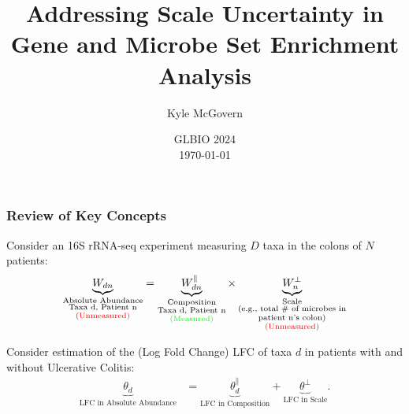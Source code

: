 \documentclass[11pt]{beamer}
\title[DSA Scale Uncertainty]{Addressing Scale Uncertainty in Gene and Microbe Set Enrichment Analysis}
\author[Kyle McGovern]{Kyle McGovern}
\institute[Penn State]{The Pennsylvania State University \\ \smallskip \textit{kvm6065@psu.edu}}
\date[\today]{GLBIO 2024 \\ \today}
\begin{document}

\begin{frame}
	\titlepage %
\end{frame}

\begin{frame}
    \frametitle{Review of Key Concepts}

    Consider an 16S rRNA-seq experiment measuring \(D\) taxa in the colons of \(N\) patients:
    \begin{align*}
      \underbrace{W_{dn}}_{\substack{\text{Absolute Abundance} \\ \text{Taxa d, Patient n} \\ \text{\textcolor{red}{(Unmeasured)}}}} = \underbrace{W^\parallel_{dn}}_{\substack{\text{Composition} \\ \text{Taxa d, Patient n} \\ \text{\textcolor{green}{(Measured)}}}} \times \underbrace{W^\perp_n}_{\substack{\text{Scale} \\ \text{(e.g., total \# of microbes in} \\ \text{patient n's colon)} \\ \text{\textcolor{red}{(Unmeasured)}}}}
    \end{align*}

    \pause

    Consider estimation of the (Log Fold Change) LFC of taxa \(d\) in patients with and without Ulcerative Colitis:
    \begin{align*}
        \underbrace{\theta_d}_{\text{LFC in Absolute Abundance}} &= \underbrace{\theta^{\parallel}_d}_{\text{LFC in Composition}}+\underbrace{\theta^\perp}_{\text{LFC in Scale}}. \nonumber
    \end{align*}

\end{frame}
\end{document}
